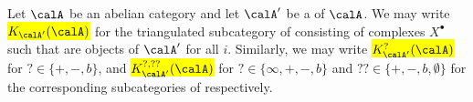 \begin{notation}\label{notation:homotopy_categories_of_an_abelian_category_whose_homology_objects_are_in_a_serre_subcategory}
    Let $\calA$ be an abelian category and let $\calA'$ be a  of $\calA$. We may write \hl{$K_{\calA'}(\calA)$} for the triangulated subcategory of  consisting of complexes $X^\bullet$ such that  are objects of $\calA'$ for all $i$. Similarly, we may write \hl{$K_{\calA'}^?(\calA)$} for $? \in \{+,-,b\}$, and \hl{$K_{\calA'}^{?,??}(\calA)$} for $? \in \{\infty, +, -, b\}$ and $?? \in \{+,-,b,\emptyset\}$ for the corresponding subcategories of  respectively.
\end{notation}